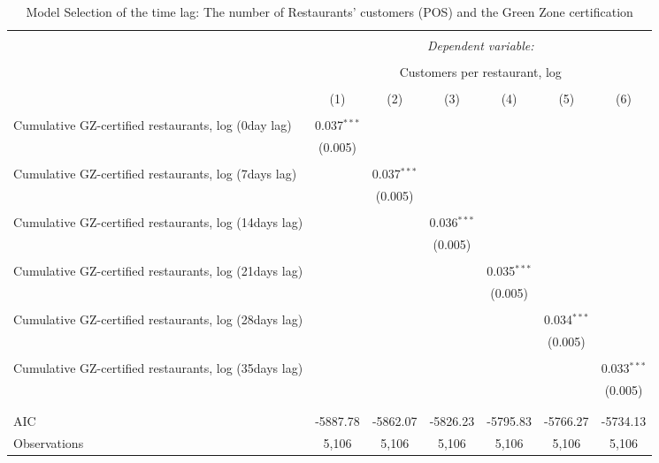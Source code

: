 
\begin{table}[!htbp] \centering 
  \caption{Model Selection of the time lag: The number of Restaurants' customers (POS) and the Green Zone certification} 
  \label{} 
\scriptsize 
\begin{tabular}{@{\extracolsep{1pt}}lcccccc} 
\\[-1.8ex]\hline 
\hline \\[-1.8ex] 
 & \multicolumn{6}{c}{\textit{Dependent variable:}} \\ 
\cline{2-7} 
\\[-1.8ex] & \multicolumn{6}{c}{Customers per restaurant, log} \\ 
\\[-1.8ex] & (1) & (2) & (3) & (4) & (5) & (6)\\ 
\hline \\[-1.8ex] 
 Cumulative GZ-certified restaurants, log (0day lag) & 0.037$^{***}$ &  &  &  &  &  \\ 
  & (0.005) &  &  &  &  &  \\ 
  & & & & & & \\ 
 Cumulative GZ-certified restaurants, log (7days lag) &  & 0.037$^{***}$ &  &  &  &  \\ 
  &  & (0.005) &  &  &  &  \\ 
  & & & & & & \\ 
 Cumulative GZ-certified restaurants, log (14days lag) &  &  & 0.036$^{***}$ &  &  &  \\ 
  &  &  & (0.005) &  &  &  \\ 
  & & & & & & \\ 
 Cumulative GZ-certified restaurants, log (21days lag) &  &  &  & 0.035$^{***}$ &  &  \\ 
  &  &  &  & (0.005) &  &  \\ 
  & & & & & & \\ 
 Cumulative GZ-certified restaurants, log (28days lag) &  &  &  &  & 0.034$^{***}$ &  \\ 
  &  &  &  &  & (0.005) &  \\ 
  & & & & & & \\ 
 Cumulative GZ-certified restaurants, log (35days lag) &  &  &  &  &  & 0.033$^{***}$ \\ 
  &  &  &  &  &  & (0.005) \\ 
  & & & & & & \\ 
\hline \\[-1.8ex] 
AIC & -5887.78 & -5862.07 & -5826.23 & -5795.83 & -5766.27 & -5734.13 \\ 
Observations & 5,106 & 5,106 & 5,106 & 5,106 & 5,106 & 5,106 \\ 

\end{tabular}
\end{table}
